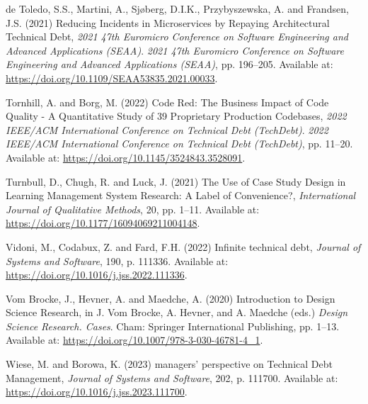\documentclass[
  12pt,
  letterpaper,
  12pt,
  oneside,
  english,
  onehalfspacing,
  headsepline]{MastersDoctoralThesis}
\newlength{\cslhangindent}
\newenvironment{CSLReferences}[2] %
 {\begin{list}{}{%
  \setlength{\itemindent}{0pt}
  \setlength{\leftmargin}{0pt}
  \setlength{\parsep}{0pt}
  \ifodd #1
   \setlength{\leftmargin}{\cslhangindent}
   \setlength{\itemindent}{-1\cslhangindent}
  \fi
  \setlength{\itemsep}{#2\baselineskip}}}
 {\end{list}}
\begin{document}
\begin{CSLReferences}{0}{1}
de Toledo, S.S., Martini, A., Sjøberg, D.I.K., Przybyszewska, A. and
Frandsen, J.S. (2021) \textquotesingle Reducing {Incidents} in
{Microservices} by {Repaying Architectural Technical
Debt}\textquotesingle, \emph{2021 47th {Euromicro Conference} on
{Software Engineering} and {Advanced Applications} ({SEAA})}. \emph{2021
47th {Euromicro Conference} on {Software Engineering} and {Advanced
Applications} ({SEAA})}, pp. 196--205. Available at:
\url{https://doi.org/10.1109/SEAA53835.2021.00033}.

Tornhill, A. and Borg, M. (2022) \textquotesingle Code {Red}: {The
Business Impact} of {Code Quality} - {A Quantitative Study} of 39
{Proprietary Production Codebases}\textquotesingle, \emph{2022
{IEEE}/{ACM International Conference} on {Technical Debt} ({TechDebt})}.
\emph{2022 {IEEE}/{ACM International Conference} on {Technical Debt}
({TechDebt})}, pp. 11--20. Available at:
\url{https://doi.org/10.1145/3524843.3528091}.

Turnbull, D., Chugh, R. and Luck, J. (2021) \textquotesingle The {Use}
of {Case Study Design} in {Learning Management System Research}: {A
Label} of {Convenience}?\textquotesingle, \emph{International Journal of
Qualitative Methods}, 20, pp. 1--11. Available at:
\url{https://doi.org/10.1177/16094069211004148}.

Vidoni, M., Codabux, Z. and Fard, F.H. (2022) \textquotesingle Infinite
technical debt\textquotesingle, \emph{Journal of Systems and Software},
190, p. 111336. Available at:
\url{https://doi.org/10.1016/j.jss.2022.111336}.

Vom Brocke, J., Hevner, A. and Maedche, A. (2020)
\textquotesingle Introduction to {Design Science
Research}\textquotesingle, in J. Vom Brocke, A. Hevner, and A. Maedche
(eds.) \emph{Design {Science Research}. {Cases}}. Cham: Springer
International Publishing, pp. 1--13. Available at:
\url{https://doi.org/10.1007/978-3-030-46781-4_1}.

Wiese, M. and Borowa, K. (2023)  managers'
perspective on {Technical Debt Management}\textquotesingle,
\emph{Journal of Systems and Software}, 202, p. 111700. Available at:
\url{https://doi.org/10.1016/j.jss.2023.111700}.


\end{CSLReferences}
\end{document}
